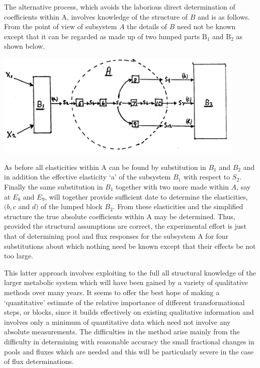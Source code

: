 The alternative process, which avoids the laborious direct determination of coefficients within A, involves knowledge of the structure of $B$ and is as follows. From the point of view of subsystem $A$ the details of $B$ need not be known except that it can be regarded as made up of two lumped parts $\mathrm{B}_1$ and $\mathrm{B}_2$ as shown below.

\begin{center}
\includegraphics[max width=0.9\textwidth]{figure3_bInternal.png}%
\end{center}

As before all elasticities within A can be found by substitution in $B_{1}$ and $B_{2}$ and in addition the effective elasticity `a' of the subsystem $B_{1}$ with respect to $S_{2}$. Finally the same substitution in $B_{1}$ together with two more made within $A$, say at $E_{8}$ and $E_{9}$, will together provide sufficient date to determine the elasticities, $(b, c$ and $d)$ of the lumped block $B_{2}$. From these elasticities and the simplified structure the true absolute coefficients within A may be determined. Thus, provided the structural assumptions are correct, the experimental effort is just that of determining pool and flux responses for the subsystem A for four substitutions about which nothing need be known except that their effects be not too large.

This latter approach involves exploiting to the full all structural knowledge of the larger metabolic system which will have been gained by a variety of qualitative methods over many years. It seems to offer the best hope of making a `quantitative' estimate of the relative importance of different transformational steps, or blocks, since it builds effectively on existing qualitative information and involves only a minimum of quantitative data which need not involve any absolute measurements. The difficulties in the method arise mainly from the difficulty in determining with reasonable accuracy the small fractional changes in pools and fluxes which are needed and this will be particularly severe in the case of flux determinations.


